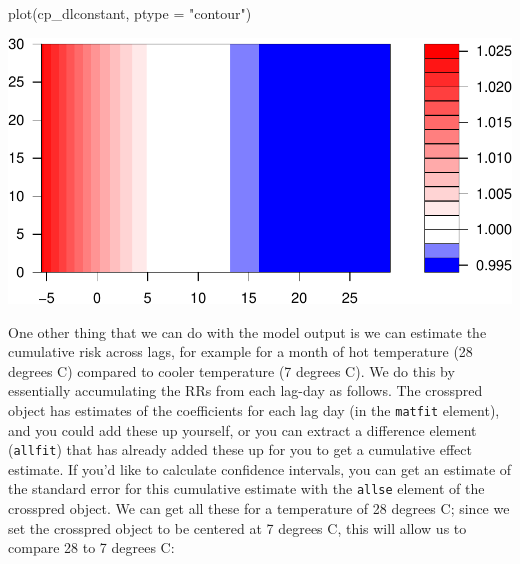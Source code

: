 \documentclass[
]{book}
\newenvironment{Shaded}{\begin{snugshade}}{\end{snugshade}}
\newcommand{\AttributeTok}[1]{\textcolor[rgb]{0.77,0.63,0.00}{#1}}
\newcommand{\DecValTok}[1]{\textcolor[rgb]{0.00,0.00,0.81}{#1}}
\newcommand{\DocumentationTok}[1]{\textcolor[rgb]{0.56,0.35,0.01}{\textbf{\textit{#1}}}}
\newcommand{\FunctionTok}[1]{\textcolor[rgb]{0.00,0.00,0.00}{#1}}
\newcommand{\NormalTok}[1]{#1}
\newcommand{\SpecialCharTok}[1]{\textcolor[rgb]{0.00,0.00,0.00}{#1}}
\newcommand{\StringTok}[1]{\textcolor[rgb]{0.31,0.60,0.02}{#1}}
\begin{document}
\begin{Shaded}
\begin{Highlighting}[]
\FunctionTok{plot}\NormalTok{(cp\_dlconstant, }\AttributeTok{ptype =} \StringTok{"contour"}\NormalTok{)}
\end{Highlighting}
\end{Shaded}

\includegraphics{adv_epi_analysis_files/figure-latex/unnamed-chunk-113-2.pdf}

One other thing that we can do with the model output is we can estimate the cumulative risk
across lags, for example for a month of hot temperature (28 degrees C) compared to cooler temperature (7 degrees C). We do this by essentially accumulating the RRs from each lag-day as follows. The crosspred object has estimates of the coefficients for each lag day (in the
\texttt{matfit} element), and you
could add these up yourself, or you can extract a difference element (\texttt{allfit}) that has
already added these up for you to get a cumulative effect estimate. If you'd like to
calculate confidence intervals, you can get an estimate of the standard error for this
cumulative estimate with the \texttt{allse} element of the crosspred object. We can get all these
for a temperature of 28 degrees C; since we set the crosspred object to be centered at
7 degrees C, this will allow us to compare 28 to 7 degrees C:

\begin{Shaded}
\end{Shaded}
\end{document}
